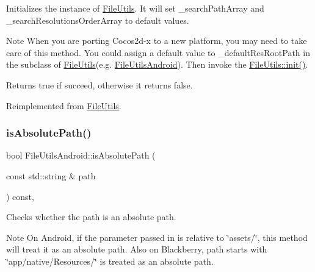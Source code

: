 Initializes the instance of \hyperlink{classFileUtils}{File\+Utils}. It will set \+\_\+search\+Path\+Array and \+\_\+search\+Resolutions\+Order\+Array to default values.

\begin{DoxyNote}{Note}
When you are porting Cocos2d-\/x to a new platform, you may need to take care of this method. You could assign a default value to \+\_\+default\+Res\+Root\+Path in the subclass of \hyperlink{classFileUtils}{File\+Utils}(e.\+g. \hyperlink{classFileUtilsAndroid}{File\+Utils\+Android}). Then invoke the \hyperlink{classFileUtils_a2c891e99dc7af7343f4f9e8d4798a563}{File\+Utils\+::init()}. 
\end{DoxyNote}
\begin{DoxyReturn}{Returns}
true if succeed, otherwise it returns false. 
\end{DoxyReturn}


Reimplemented from \hyperlink{classFileUtils_a2c891e99dc7af7343f4f9e8d4798a563}{File\+Utils}.

\mbox{\label{classFileUtilsAndroid_aa2d3fbd2b0938439a329a0df42ef0faa}} 
\subsubsection{\texorpdfstring{is\+Absolute\+Path()}{isAbsolutePath()}\hspace{0.1cm}{\footnotesize\ttfamily [1/2]}}
{\footnotesize\ttfamily bool File\+Utils\+Android\+::is\+Absolute\+Path (\begin{DoxyParamCaption}\item[{const std\+::string \&}]{path }\end{DoxyParamCaption}) const\hspace{0.3cm}{\ttfamily [override]}, {\ttfamily [virtual]}}

Checks whether the path is an absolute path.

\begin{DoxyNote}{Note}
On Android, if the parameter passed in is relative to \char`\"{}assets/\char`\"{}, this method will treat it as an absolute path. Also on Blackberry, path starts with \char`\"{}app/native/\+Resources/\char`\"{} is treated as an absolute path.
\end{DoxyNote}

